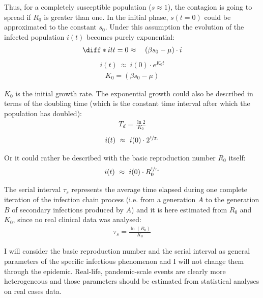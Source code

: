 \documentclass[DIV=12, BCOR=0pt]{scrartcl}  %
\begin{document}
  Thus, for a completely susceptible population ($s \approx 1$), the contagion is going to spread if $R_0$ is greater than one. In the initial phase, $s(t=0)$ could be approximated to the constant $s_0$.
  Under this assumption the evolution of the infected population $i(t)$ becomes purely exponential:
  \begin{align}
  	\diff*{i}{t}{t=0} \approx \quad (\beta s_0 - \mu) \cdot i 
  	\label{eq:sir_approxi}
  \end{align}
  \begin{align} %
  	i(t) \ \approx \ i(0) \cdot e^{K_0 t} 
  	\label{eq:sir_growthK0}
  \end{align}
  \begin{align} %
  	K_0 = (\beta s_0 - \mu)
  	\label{eq:sir_K0}
  \end{align}
	
	$K_0$ is the initial growth rate. The exponential growth could also be described in terms of the doubling time (which is the constant time interval after which the population has doubled):
	\begin{align}
		T_{d} = \frac{\ln 2}{K_0}
		\label{eq:doubling} 
	\end{align}
	\begin{align}
		i(t) \ \approx \ i(0) \cdot 2^{\sfrac{t}{T_{d}}}
		\label{eq:sir_growthTd} 
	\end{align}

	Or it could rather be described with the basic reproduction number $R_0$ itself:
	\begin{align}
		i(t) \ \approx \ i(0) \cdot R_0^{\sfrac{t}{\tau_s}}
		\label{eq:sir_growthR0}
	\end{align}

	The serial interval $\tau_s$ represents the average time elapsed during one complete iteration of the infection chain process (i.e. from a generation $A$ to the generation $B$ of secondary infections produced by $A$) and it is here estimated from $R_0$ and $K_0$, since no real clinical data was analysed: 
	\begin{align}
		\tau_s = \frac{\ln(R_0)}{K_0}
		\label{eq:serial}
	\end{align}

	I will consider the basic reproduction number and the serial interval as general parameters of the specific infectious phenomenon and I will not change them through the epidemic. Real-life, pandemic-scale events are clearly more heterogeneous and those parameters should be estimated from statistical analyses on real cases data.  
\end{document}
